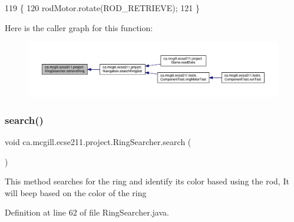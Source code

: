 \begin{DoxyCode}
119                              \{
120     rodMotor.rotate(ROD\_RETRIEVE);
121   \}
\end{DoxyCode}
Here is the caller graph for this function\+:
\nopagebreak
\begin{figure}[H]
\begin{center}
\leavevmode
\includegraphics[width=350pt]{classca_1_1mcgill_1_1ecse211_1_1project_1_1_ring_searcher_afca3a0c746b07abb88881d926f4fe71f_icgraph}
\end{center}
\end{figure}
\mbox{\label{classca_1_1mcgill_1_1ecse211_1_1project_1_1_ring_searcher_a7ff5756046a0ce992ed8cb8954139c3b}} 
\subsubsection{\texorpdfstring{search()}{search()}}
{\footnotesize\ttfamily void ca.\+mcgill.\+ecse211.\+project.\+Ring\+Searcher.\+search (\begin{DoxyParamCaption}{ }\end{DoxyParamCaption})}

This method searches for the ring and identify its color based using the rod, It will beep based on the color of the ring 

Definition at line 62 of file Ring\+Searcher.\+java.


